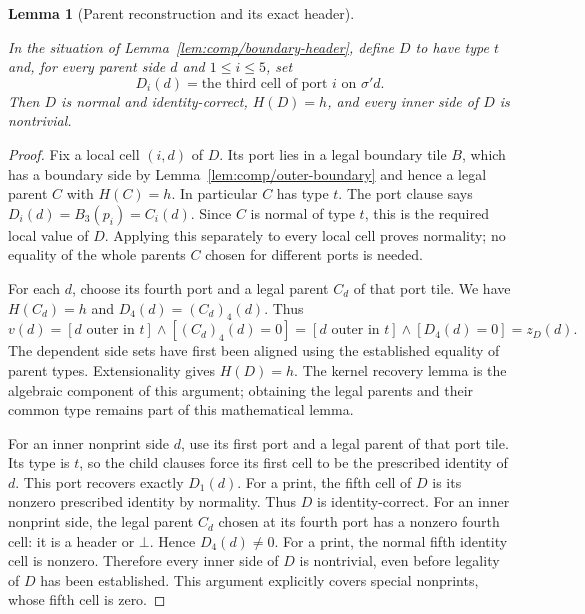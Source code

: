 \documentclass[11pt,a4paper]{article}
\newtheorem{lemma}[definition]{Lemma}
\theoremstyle{remark}
\newcommand{\lean}[1]{}
\newcommand{\uses}[1]{}
\begin{document}
\begin{lemma}[Parent reconstruction and its exact header]
\label{lem:comp/reconstruction}
\lean{Tilings.Planned.reconstructed_header_eq,Tilings.Planned.Strict.strict_reconstructed_header_eq}
\uses{lem:comp/boundary-header,lem:comp/port-recovery,def:control/typed-decoration}
In the situation of Lemma~\ref{lem:comp/boundary-header}, define $D$ to have
type $t$ and, for every parent side $d$ and $1\le i\le5$, set
\[
 D_i(d)=\text{the third cell of port }i\text{ on }\sigma'd.
\]
Then $D$ is normal and identity-correct, $H(D)=h$, and every inner side of
$D$ is nontrivial.
\end{lemma}
\begin{proof}
Fix a local cell $(i,d)$ of $D$. Its port lies in a legal boundary tile $B$,
which has a boundary side by Lemma~\ref{lem:comp/outer-boundary} and hence
a legal parent $C$ with $H(C)=h$.
In particular $C$ has type $t$. The port clause says $D_i(d)=B_3(p_i)=C_i(d)$.
Since $C$ is normal of type $t$, this is the required local value of $D$.
Applying this separately to every local cell proves normality; no equality
of the whole parents $C$ chosen for different ports is needed.

For each $d$, choose its fourth port and a legal parent $C_d$ of that port
tile. We have $H(C_d)=h$ and $D_4(d)=(C_d)_4(d)$. Thus
\[
 v(d)=[d\text{ outer in }t]\wedge[(C_d)_4(d)=0]
     =[d\text{ outer in }t]\wedge[D_4(d)=0]=z_D(d).
\]
The dependent side sets have first been aligned using the established
equality of parent types. Extensionality gives $H(D)=h$. The kernel recovery
lemma is the algebraic component of this argument; obtaining the legal
parents and their common type remains part of this mathematical lemma.

For an inner nonprint side $d$, use its first port and a legal parent of
that port tile. Its type is $t$, so the child clauses force its first cell
to be the prescribed identity of $d$. This port recovers exactly $D_1(d)$.
For a print, the fifth cell of $D$ is its nonzero prescribed identity by
normality. Thus $D$ is identity-correct. For an inner nonprint side, the
legal parent $C_d$ chosen at its fourth port has a nonzero fourth cell: it
is a header or $\bot$. Hence $D_4(d)\ne0$. For a print, the normal fifth
identity cell is nonzero. Therefore every inner side of $D$ is nontrivial,
even before legality of $D$ has been established. This argument explicitly
covers special nonprints, whose fifth cell is zero.
\end{proof}
\end{document}

